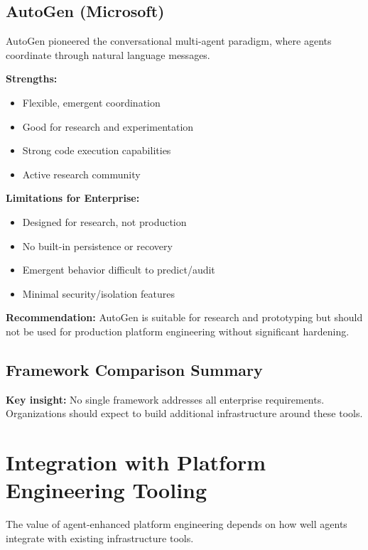 \subsection{AutoGen (Microsoft)}
\label{subsec:autogen}

AutoGen pioneered the conversational multi-agent paradigm, where agents coordinate through natural language messages.

\textbf{Strengths:}
\begin{itemize}
    \item Flexible, emergent coordination
    \item Good for research and experimentation
    \item Strong code execution capabilities
    \item Active research community
\end{itemize}

\textbf{Limitations for Enterprise:}
\begin{itemize}
    \item Designed for research, not production
    \item No built-in persistence or recovery
    \item Emergent behavior difficult to predict/audit
    \item Minimal security/isolation features
\end{itemize}

\textbf{Recommendation:} AutoGen is suitable for research and prototyping but should not be used for production platform engineering without significant hardening.

\subsection{Framework Comparison Summary}
\label{subsec:framework-summary}

\textbf{Key insight:} No single framework addresses all enterprise requirements. Organizations should expect to build additional infrastructure around these tools.

\section{Integration with Platform Engineering Tooling}
\label{sec:platform-integration}

The value of agent-enhanced platform engineering depends on how well agents integrate with existing infrastructure tools.


